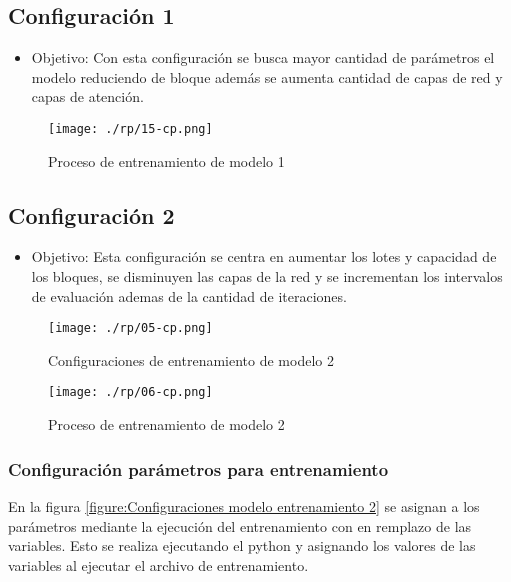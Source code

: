 \subsection{Configuración 1}\label{section:Configuración de los parámetros del código} 
\begin{itemize}
	\item   Objetivo: Con esta configuración se busca mayor cantidad de parámetros el modelo reduciendo de bloque además se aumenta cantidad de capas de red y capas de atención.
\end{itemize}
\begin{figure}[H]
	\centering %
	\texttt{[image: ./rp/15-cp.png]} 
	\caption{Proceso de entrenamiento de modelo 1\cite{}}
	\label{figure:Resultado 1}  %
\end{figure}
\subsection{Configuración 2}\label{section:Configuración de los parámetros del código} 
\begin{itemize}
	\item   Objetivo: Esta configuración se centra en aumentar los lotes y capacidad de los bloques, se disminuyen las capas de la red y se incrementan los intervalos de evaluación ademas de la cantidad de iteraciones.
\end{itemize}
\begin{figure}[H]
	\centering %
	\texttt{[image: ./rp/05-cp.png]} 
	\caption{Configuraciones de entrenamiento de modelo 2  \cite{}}
	\label{figure:Resultado 1}  %
\end{figure}
\begin{figure}[H]
	\centering %
	\texttt{[image: ./rp/06-cp.png]} 
	\caption{Proceso de entrenamiento de modelo 2\cite{}}
	\label{figure:Resultado 1}  %
\end{figure}



\subsubsection{Configuración parámetros para entrenamiento}\label{section:Configuración de los parámetros del código} 
En la figura \ref{figure:Configuraciones modelo entrenamiento 2} se asignan a los parámetros mediante la ejecución del entrenamiento con en remplazo de las variables. Esto se realiza ejecutando el python y asignando los valores de las variables al ejecutar el archivo de entrenamiento.

